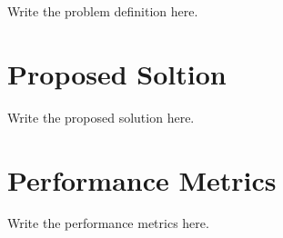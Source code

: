 \documentclass[10pt,journal,draftclsnofoot,onecolumn]{IEEEtran}
\begin{document}
Write the problem definition here.
\section{Proposed Soltion}
Write the proposed solution here.
\section{Performance Metrics}
Write the performance metrics here.
\end{document}
